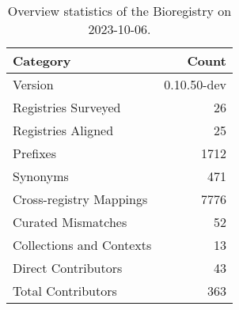 \begin{table}
\caption{Overview statistics of the Bioregistry on 2023-10-06.}
\label{tab:bioregistry-summary}
\begin{tabular}{lr}
\toprule
Category & Count \\
\midrule
Version & 0.10.50-dev \\
Registries Surveyed & 26 \\
Registries Aligned & 25 \\
Prefixes & 1712 \\
Synonyms & 471 \\
Cross-registry Mappings & 7776 \\
Curated Mismatches & 52 \\
Collections and Contexts & 13 \\
Direct Contributors & 43 \\
Total Contributors & 363 \\
\bottomrule
\end{tabular}
\end{table}
